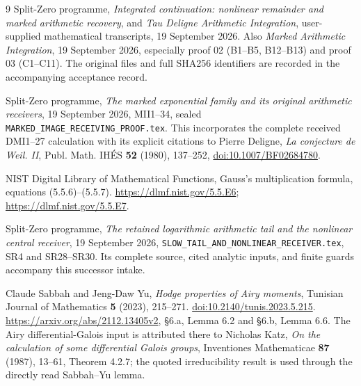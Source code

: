 \documentclass[11pt]{article}
\begin{document}
\begin{thebibliography}{9}
Split-Zero programme, \emph{Integrated continuation: nonlinear
remainder and marked arithmetic recovery}, and \emph{Tau Deligne
Arithmetic Integration}, user-supplied mathematical transcripts,
19 September 2026. Also \emph{Marked Arithmetic Integration},
19 September 2026, especially proof 02 (B1--B5, B12--B13) and
proof 03 (C1--C11). The original files and full SHA256 identifiers
are recorded in the accompanying acceptance record.

Split-Zero programme, \emph{The marked exponential family and its
original arithmetic receivers}, 19 September 2026, MII1--34,
sealed \texttt{MARKED\_IMAGE\_RECEIVING\_PROOF.tex}.
This incorporates the complete received DMI1--27 calculation
with its explicit citations to Pierre Deligne, \emph{La conjecture
de Weil. II}, Publ. Math. IH\'ES \textbf{52} (1980), 137--252,
\href{https://doi.org/10.1007/BF02684780}{doi:10.1007/BF02684780}.

NIST Digital Library of Mathematical Functions,
Gauss's multiplication formula, equations (5.5.6)--(5.5.7).
\url{https://dlmf.nist.gov/5.5.E6};
\url{https://dlmf.nist.gov/5.5.E7}.

Split-Zero programme, \emph{The retained logarithmic arithmetic tail
and the nonlinear central receiver}, 19 September 2026,
\texttt{SLOW\_TAIL\_AND\_NONLINEAR\_RECEIVER.tex},
SR4 and SR28--SR30. Its complete source, cited analytic inputs,
and finite guards accompany this successor intake.

Claude Sabbah and Jeng-Daw Yu, \emph{Hodge properties of Airy moments},
Tunisian Journal of Mathematics \textbf{5} (2023), 215--271.
\href{https://doi.org/10.2140/tunis.2023.5.215}{doi:10.2140/tunis.2023.5.215}.
\url{https://arxiv.org/abs/2112.13405v2}, \S6.a, Lemma 6.2 and
\S6.b, Lemma 6.6. The Airy differential-Galois input is attributed
there to Nicholas Katz, \emph{On the calculation of some differential
Galois groups}, Inventiones Mathematicae \textbf{87} (1987), 13--61,
Theorem 4.2.7; the quoted irreducibility result is used through the
directly read Sabbah--Yu lemma.
\end{thebibliography}
\end{document}
